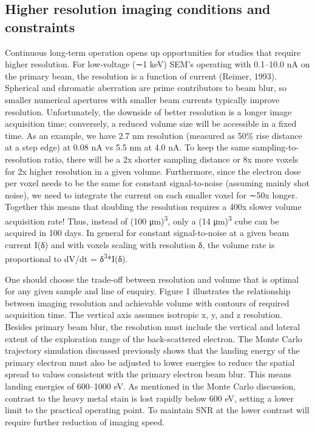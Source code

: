 \documentclass{article}
\begin{document}
\subsection*{Higher resolution imaging conditions and constraints}

Continuous long-term operation opens up opportunities for studies that require higher resolution. For low-voltage (∼1 keV) SEM’s operating with 0.1–10.0 nA on the primary beam, the resolution is a function of current (Reimer, 1993). Spherical and chromatic aberration are prime contributors to beam blur, so smaller numerical apertures with smaller beam currents typically improve resolution. Unfortunately, the downside of better resolution is a longer image acquisition time; conversely, a reduced volume size will be accessible in a fixed time. As an example, we have 2.7 nm resolution (measured as 50\% rise distance at a step edge) at 0.08 nA vs 5.5 nm at 4.0 nA. To keep the same sampling-to-resolution ratio, there will be a 2x shorter sampling distance or 8x more voxels for 2x higher resolution in a given volume. Furthermore, since the electron dose per voxel needs to be the same for constant signal-to-noise (assuming mainly shot noise), we need to integrate the current on each smaller voxel for ∼50x longer. Together this means that doubling the resolution requires a 400x slower volume acquisition rate! Thus, instead of (100 μm)\textsuperscript{3}, only a (14 μm)\textsuperscript{3} cube can be acquired in 100 days. In general for constant signal-to-noise at a given beam current I(δ) and with voxels scaling with resolution δ, the volume rate is proportional to dV/dt = δ\textsuperscript{3}*I(δ).

One should choose the trade-off between resolution and volume that is optimal for any given sample and line of enquiry. Figure 1 illustrates the relationship between imaging resolution and achievable volume with contours of required acquisition time. The vertical axis assumes isotropic x, y, and z resolution. Besides primary beam blur, the resolution must include the vertical and lateral extent of the exploration range of the back-scattered electron. The Monte Carlo trajectory simulation discussed previously shows that the landing energy of the primary electron must also be adjusted to lower energies to reduce the spatial spread to values consistent with the primary electron beam blur. This means landing energies of 600–1000 eV. As mentioned in the Monte Carlo discussion, contrast to the heavy metal stain is lost rapidly below 600 eV, setting a lower limit to the practical operating point. To maintain SNR at the lower contrast will require further reduction of imaging speed.
\end{document}
